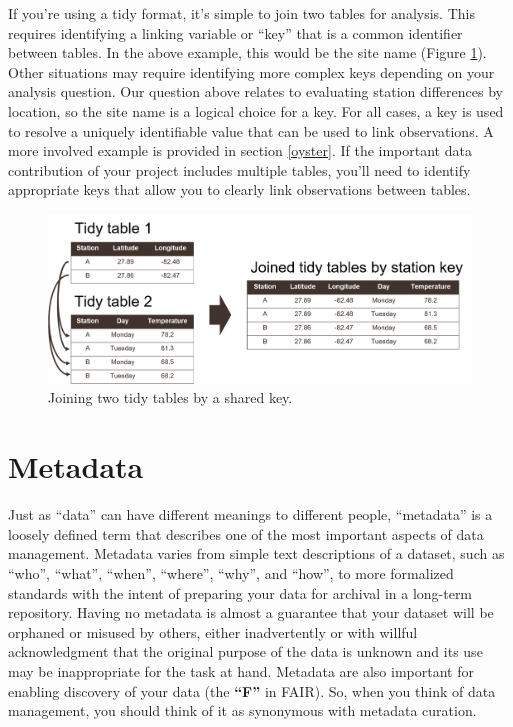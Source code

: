 \documentclass[
]{book}
\begin{document}
If you're using a tidy format, it's simple to join two tables for analysis. This requires identifying a linking variable or ``key'' that is a common identifier between tables. In the above example, this would be the site name (Figure \ref{fig:joins}). Other situations may require identifying more complex keys depending on your analysis question. Our question above relates to evaluating station differences by location, so the site name is a logical choice for a key. For all cases, a key is used to resolve a uniquely identifiable value that can be used to link observations. A more involved example is provided in section \ref{oyster}. If the important data contribution of your project includes multiple tables, you'll need to identify appropriate keys that allow you to clearly link observations between tables.

\begin{figure}

{\centering \includegraphics[width=1\linewidth]{img/joins} 

}

\caption{Joining two tidy tables by a shared key.}\label{fig:joins}
\end{figure}

\section{Metadata}\label{metadatadesc}

Just as ``data'' can have different meanings to different people, ``metadata'' is a loosely defined term that describes one of the most important aspects of data management. Metadata varies from simple text descriptions of a dataset, such as ``who'', ``what'', ``when'', ``where'', ``why'', and ``how'', to more formalized standards with the intent of preparing your data for archival in a long-term repository. Having no metadata is almost a guarantee that your dataset will be orphaned or misused by others, either inadvertently or with willful acknowledgment that the original purpose of the data is unknown and its use may be inappropriate for the task at hand. Metadata are also important for enabling discovery of your data (the \textbf{``F''} in FAIR). So, when you think of data management, you should think of it as synonymous with metadata curation.
\end{document}

